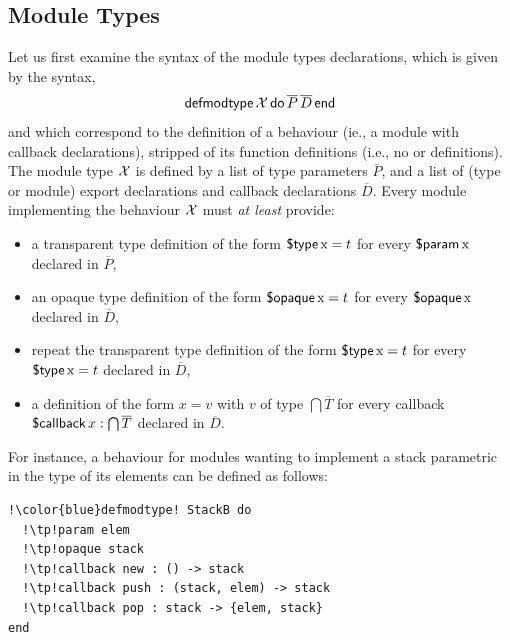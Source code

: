 \documentclass[a4paper,10pt]{article}
\begin{document}
\subsection{Module Types}
Let us first examine the syntax of the module types declarations, which is given by the syntax, \[\operatorname{\textsf{defmodtype}} \mathcal{X}\operatorname{\textsf{do}} \overline{P}\, \overline{D} \operatorname{\textsf{end}}\] and which correspond to the definition of a behaviour (ie., a module with callback declarations), stripped of its function definitions (i.e., no  or  definitions). The module type $\mathcal{X}$ is defined by a list of type parameters $\overline{P}$, and a list of (type or module) export declarations and callback declarations $\overline{D}$. Every module implementing the behaviour $\mathcal{X}$ must \emph{at least} provide:
\begin{itemize}
    \item a transparent type definition of the form $\operatorname{\textsf{\$type}} \text{\rm x} = t$ for every $\operatorname{\textsf{\$param}} \text{\rm x}$ declared in $\overline{P}$,
    \item an opaque type definition of the form $\operatorname{\textsf{\$opaque}} \text{\rm x} = t$ for every $\operatorname{\textsf{\$opaque}} \text{\rm x}$ declared in $\overline{D}$,
    \item repeat the transparent type definition of the form $\operatorname{\textsf{\$type}} \text{\rm x} = t$ for every $\operatorname{\textsf{\$type}} \text{\rm x} = t$ declared in $\overline{D}$,
    \item a definition of the form $x = v$  with $v$ of type $\bigcap\overline{T}$ for every callback $\operatorname{\textsf{\$callback}} x : \bigcap \overline{T}$ declared in $\overline{D}$.
\end{itemize} 
For instance, a  behaviour for modules wanting to implement a stack parametric in the type of its elements can be defined as follows:
\begin{verbatim}
!\color{blue}defmodtype! StackB do
  !\tp!param elem
  !\tp!opaque stack
  !\tp!callback new : () -> stack
  !\tp!callback push : (stack, elem) -> stack
  !\tp!callback pop : stack -> {elem, stack}
end
\end{verbatim}
\end{document}
